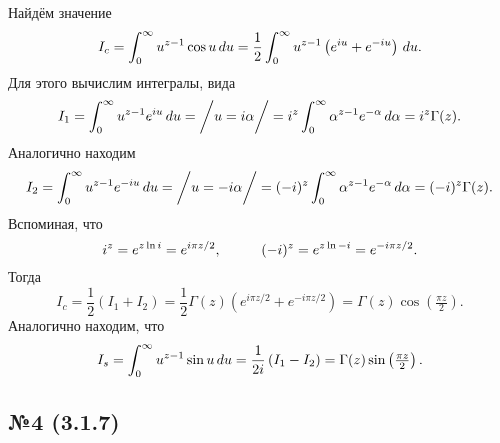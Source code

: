 Найдём значение
\begin{equation*}
    I_c = \int_{0}^{\infty}  u^{z-1} \cos u \, d u = \frac{1}{2} \int_{0}^{\infty} u^{z-1} \left(e^{i u} + e^{-iu}\right) \, d u.
\end{equation*}
Для этого вычислим интегралы, вида
\begin{equation*}
    I_1 = \int_{0}^{\infty} u^{z-1} e^{i u} \, d u = \bigg/ u = i \alpha \bigg/ = 
    i^z \int_{0}^{\infty} \alpha^{z-1} e^{-\alpha} \, d \alpha = i^{z} \Gamma(z).
\end{equation*}
Аналогично находим
\begin{equation*}
    I_2 = \int_{0}^{\infty} u^{z-1} e^{-i u} \, d u = \bigg/ u = -i \alpha \bigg/ = 
    (-i)^z \int_{0}^{\infty} \alpha^{z-1} e^{-\alpha} \, d \alpha = (-i)^{z} \Gamma(z).
\end{equation*}
Вспоминая, что
\begin{equation*}
    i^{z} = e^{z \ln i} = e^{i \pi z /2}, \hspace{10 mm} 
    (-i)^z = e^{z \ln -i} = e^{- i \pi z  /2}.
\end{equation*}
Тогда
\begin{equation*}
    I_c = \frac{1}{2}\left(I_1 + I_2\right) = \frac{1}{2} \Gamma(z) \left(e^{i \pi z / 2} + e^{- i \pi z/2}\right) = \Gamma(z) \cos \left(\tfrac{\pi z}{2}\right).
\end{equation*}
Аналогично находим, что
\begin{equation*}
    I_s = \int_{0}^{\infty} u^{z-1} \sin u \, d u = \frac{1}{2i}\left(I_1-I_2\right) = \Gamma(z) \sin\left(\tfrac{\pi z}{2}\right).
\end{equation*}






\subsection*{№4 (3.1.7)}

